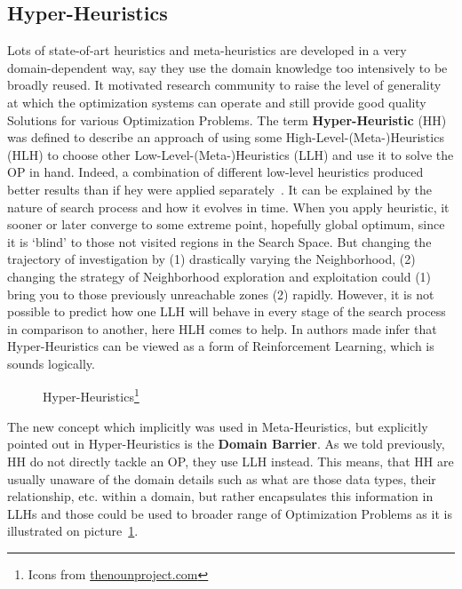 \subsection{Hyper-Heuristics}
Lots of state-of-art heuristics and meta-heuristics are developed in a very domain-dependent way, say they use the domain knowledge too intensively to be broadly reused. It motivated research community to raise the level of generality at which the optimization systems can operate and still provide good quality Solutions for various Optimization Problems. The term \textbf{Hyper-Heuristic} (HH) was defined to describe an approach of using some High-Level-(Meta-)Heuristics (HLH) to choose other Low-Level-(Meta-)Heuristics (LLH) and use it to solve the OP in hand. Indeed, a combination of different low-level heuristics produced better results than if hey were applied separately~\cite{drake2019recent}.
It can be explained by the nature of search process and how it evolves in time. When you apply heuristic, it sooner or later converge to some extreme point, hopefully global optimum, since it is `blind' to those not visited regions in the Search Space. But changing the trajectory of investigation by (1) drastically varying the Neighborhood, (2) changing the strategy of Neighborhood exploration and exploitation could (1) bring you to those previously unreachable zones (2) rapidly. However, it is not possible to predict how one LLH will behave in every stage of the search process in comparison to another, here HLH comes to help. In \cite{moriarty1999evolutionary} authors made infer that Hyper-Heuristics can be viewed as a form of Reinforcement Learning, which is sounds logically.

\begin{figure}
	\centering
	
	\caption[Hyper-Heuristics]{Hyper-Heuristics\protect\footnote{Icons from \href{https://thenounproject.com/}{thenounproject.com}}}
	\label{bg:pic:HH}
\end{figure}



The new concept which implicitly was used in Meta-Heuristics, but explicitly pointed out in Hyper-Heuristics is the \textbf{Domain Barrier}.
As we told previously, HH do not directly tackle an OP, they use LLH instead. This means, that HH are usually unaware of the domain details such as what are those data types, their relationship, etc. within a domain, but rather encapsulates this information in LLHs and those could be used to broader range of Optimization Problems as it is illustrated on picture~\ref{bg:pic:HH}.


